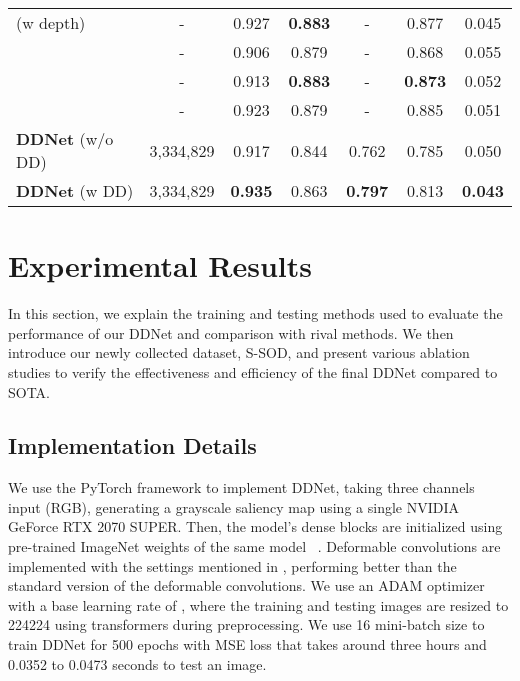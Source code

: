 \documentclass{article}
\begin{document}
\begin{table*}[tbp!h]
\begin{center}
\begin{tabular}[width=\columnwidth]{l||c|ccccc}
\cite{zhang2020uncertainty} (w depth)   & - & 0.927 & \textbf{0.883} & - & 0.877 & 0.045 \\
\cite{zhai2020bifurcated}    & - & 0.906 & 0.879 & - & 0.868 & 0.055 \\ 
\cite{zhang2020bilateral}    & - & 0.913 & \textbf{0.883} & - & \textbf{0.873} & 0.052 \\
\cite{fu2020jl}              & - & 0.923 & 0.879 & - & 0.885 & 0.051  \\ \hline \hline
\textbf{DDNet} (w/o DD)  & 3,334,829 & 0.917 & 0.844 & 0.762 & 0.785 & 0.050 \\ 
\textbf{DDNet} (w DD)    & 3,334,829 & \textbf{0.935} & 0.863 & \textbf{0.797} & 0.813 & \textbf{0.043}  \\ \hline \hline

\end{tabular} 
\end{center}
\label{tab:resultscomparison}
\end{table*}

\section{Experimental Results}
In this section, we explain the training and testing methods used to evaluate the performance of our DDNet and comparison with rival methods. We then introduce our newly collected dataset, S-SOD, and present various ablation studies to verify the effectiveness and efficiency of the final DDNet compared to SOTA.

\subsection{Implementation Details}
We use the PyTorch framework to implement DDNet, taking three channels input (RGB), generating a grayscale saliency map using a single NVIDIA GeForce RTX 2070 SUPER. Then, the model's dense blocks are initialized using pre-trained ImageNet weights of the same model ~\cite{huang2017densely}. Deformable convolutions are implemented with the settings mentioned in \cite{zhu2019deformable}, performing better than the standard version of the deformable convolutions. We use an ADAM optimizer with a base learning rate of , where the training and testing images are resized to 224224 using transformers during preprocessing. We use 16 mini-batch size to train DDNet for 500 epochs with MSE loss that takes around three hours and 0.0352 to 0.0473 seconds to test an image.
\end{document}
